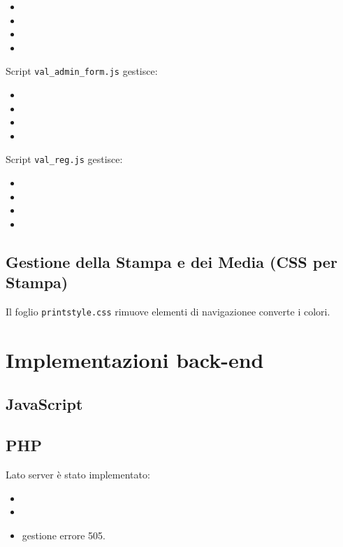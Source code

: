 \documentclass{article}
\begin{document}
\begin{itemize}
    \item 
    \item
    \item 
    \item 
\end{itemize}

Script \texttt{val\_admin\_form.js} gestisce:

\begin{itemize}
    \item 
    \item
    \item 
    \item 
\end{itemize}

Script \texttt{val\_reg.js} gestisce:

\begin{itemize}
    \item 
    \item
    \item 
    \item 
\end{itemize}



\subsection{Gestione della Stampa e dei Media (CSS per Stampa)}
Il foglio \texttt{printstyle.css} rimuove elementi di navigazionee converte i colori.

\newpage


\section{Implementazioni back-end}



\subsection{JavaScript}


\subsection{PHP}

Lato server è stato implementato:

\begin{itemize}
    \item
    \item 
    \item gestione errore 505.
\end{itemize}
\end{document}
